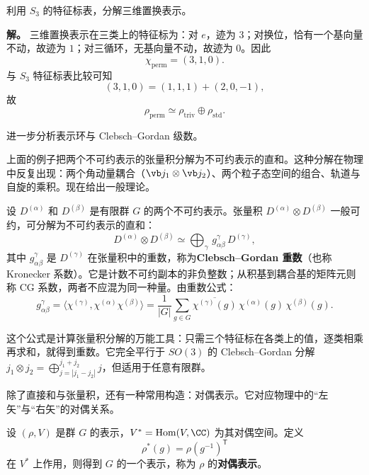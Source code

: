 \begin{workedexample}
利用 $S_3$ 的特征标表，分解三维置换表示。

\textbf{解。} 三维置换表示在三类上的特征标为：对 $e$，迹为 $3$；对换位，恰有一个基向量不动，故迹为 $1$；对三循环，无基向量不动，故迹为 $0$。因此
\[
\chi_{\mathrm{perm}}=(3,1,0).
\]
与 $S_3$ 特征标表比较可知
\[
(3,1,0)=(1,1,1)+(2,0,-1),
\]
故
\[
\rho_{\mathrm{perm}}\simeq \rho_{\mathrm{triv}}\oplus \rho_{\mathrm{std}}.
\]
\end{workedexample}


进一步分析表示环与 Clebsch--Gordan 级数。

上面的例子把两个不可约表示的张量积分解为不可约表示的直和。这种分解在物理中反复出现：两个角动量耦合（$\vb j_1\otimes\vb j_2$）、两个粒子态空间的组合、轨道与自旋的乘积。现在给出一般理论。

\begin{definition}
设 $D^{(\alpha)}$ 和 $D^{(\beta)}$ 是有限群 $G$ 的两个不可约表示。张量积 $D^{(\alpha)}\otimes D^{(\beta)}$ 一般可约，可分解为不可约表示的直和：
\begin{equation}
D^{(\alpha)}\otimes D^{(\beta)}
\simeq\bigoplus_\gamma\,g_{\alpha\beta}^\gamma\,D^{(\gamma)},
\label{eq:cg-series-finite}
\end{equation}
其中 $g_{\alpha\beta}^\gamma$ 是 $D^{(\gamma)}$ 在张量积中的重数，称为\textbf{Clebsch--Gordan 重数}（也称 Kronecker 系数）。它是计数不可约副本的非负整数；从积基到耦合基的矩阵元则称 CG 系数，两者不应混为同一种量。由重数公式：
\begin{equation}
g_{\alpha\beta}^\gamma
=\langle\chi^{(\gamma)},\chi^{(\alpha)}\chi^{(\beta)}\rangle
=\frac1{|G|}\sum_{g\in G}\overline{\chi^{(\gamma)}(g)}\,\chi^{(\alpha)}(g)\,\chi^{(\beta)}(g).
\label{eq:cg-coefficient-formula}
\end{equation}
\end{definition}

这个公式是计算张量积分解的万能工具：只需三个特征标在各类上的值，逐类相乘再求和，就得到重数。它完全平行于 $SO(3)$ 的 Clebsch--Gordan 分解 $j_1\otimes j_2=\bigoplus_{j=|j_1-j_2|}^{j_1+j_2}j$，但适用于任意有限群。

除了直接和与张量积，还有一种常用构造：对偶表示。它对应物理中的“左矢”与“右矢”的对偶关系。

\begin{definition}[对偶表示]
设 $(\rho,V)$ 是群 $G$ 的表示，$V^*=\operatorname{Hom}(V,\CC)$ 为其对偶空间。定义
\[
\rho^*(g)=\rho(g^{-1})^{\mathsf T}
\]
在 $V^*$ 上作用，则得到 $G$ 的一个表示，称为 $\rho$ 的\textbf{对偶表示}。
\label{def:dual-representation}
\end{definition}

